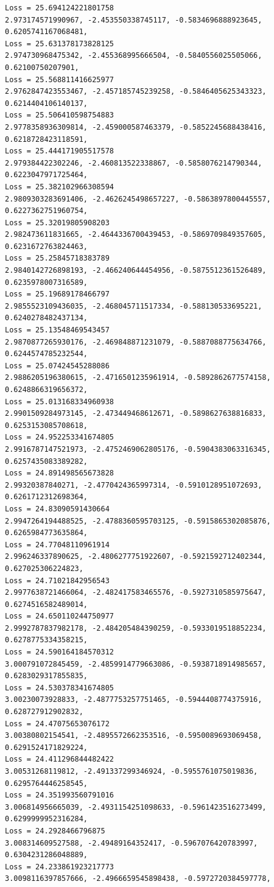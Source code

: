 \documentclass[11pt]{article}
\begin{document}
\begin{Verbatim}[commandchars=\\\{\}]
Loss = 25.694124221801758
2.973174571990967, -2.453550338745117, -0.5834696888923645, 0.6205741167068481,
Loss = 25.631378173828125
2.974730968475342, -2.455368995666504, -0.5840556025505066, 0.62100750207901,
Loss = 25.568811416625977
2.9762847423553467, -2.457185745239258, -0.5846405625343323, 0.6214404106140137,
Loss = 25.506410598754883
2.9778358936309814, -2.459000587463379, -0.5852245688438416, 0.6218728423118591,
Loss = 25.444171905517578
2.979384422302246, -2.460813522338867, -0.5858076214790344, 0.6223047971725464,
Loss = 25.382102966308594
2.9809303283691406, -2.4626245498657227, -0.5863897800445557,
0.6227362751960754,
Loss = 25.32019805908203
2.982473611831665, -2.4644336700439453, -0.5869709849357605, 0.6231672763824463,
Loss = 25.25845718383789
2.9840142726898193, -2.466240644454956, -0.5875512361526489, 0.6235978007316589,
Loss = 25.19689178466797
2.9855523109436035, -2.468045711517334, -0.588130533695221, 0.6240278482437134,
Loss = 25.13548469543457
2.9870877265930176, -2.469848871231079, -0.5887088775634766, 0.6244574785232544,
Loss = 25.07424545288086
2.9886205196380615, -2.4716501235961914, -0.5892862677574158,
0.6248866319656372,
Loss = 25.013168334960938
2.9901509284973145, -2.473449468612671, -0.5898627638816833, 0.6253153085708618,
Loss = 24.952253341674805
2.9916787147521973, -2.4752469062805176, -0.5904383063316345,
0.6257435083389282,
Loss = 24.891498565673828
2.99320387840271, -2.4770424365997314, -0.5910128951072693, 0.6261712312698364,
Loss = 24.83090591430664
2.9947264194488525, -2.4788360595703125, -0.5915865302085876,
0.6265984773635864,
Loss = 24.77048110961914
2.996246337890625, -2.4806277751922607, -0.5921592712402344, 0.627025306224823,
Loss = 24.71021842956543
2.9977638721466064, -2.482417583465576, -0.5927310585975647, 0.6274516582489014,
Loss = 24.650110244750977
2.9992787837982178, -2.484205484390259, -0.5933019518852234, 0.6278775334358215,
Loss = 24.590164184570312
3.000791072845459, -2.4859914779663086, -0.5938718914985657, 0.6283029317855835,
Loss = 24.530378341674805
3.00230073928833, -2.4877753257751465, -0.5944408774375916, 0.628727912902832,
Loss = 24.47075653076172
3.00380802154541, -2.4895572662353516, -0.5950089693069458, 0.6291524171829224,
Loss = 24.411296844482422
3.00531268119812, -2.491337299346924, -0.5955761075019836, 0.6295764446258545,
Loss = 24.351993560791016
3.006814956665039, -2.4931154251098633, -0.5961423516273499, 0.6299999952316284,
Loss = 24.2928466796875
3.008314609527588, -2.49489164352417, -0.5967076420783997, 0.6304231286048889,
Loss = 24.233861923217773
3.0098116397857666, -2.4966659545898438, -0.5972720384597778,

\end{Verbatim}
\end{document}
